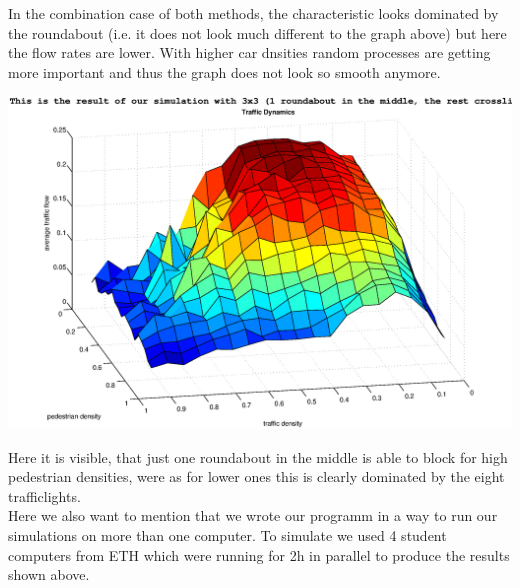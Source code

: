 In the combination case of both methods, the characteristic looks dominated by the roundabout (i.e. it does not look much different to the graph above) but here the flow rates are lower. With higher car dnsities random processes are getting more important
and thus the graph does not look so smooth anymore.

{\centering\includegraphics[width=15cm]{images/3-3-mix.eps}}

Here it is visible, that just one roundabout in the middle is able to block for high pedestrian densities, were as for lower ones this is clearly dominated by the eight trafficlights. \\

Here we also want to mention that we wrote our programm in a way to run our simulations on more than one computer. To simulate we used 4 student computers from ETH which were running for 2h in parallel to produce the results shown above.


